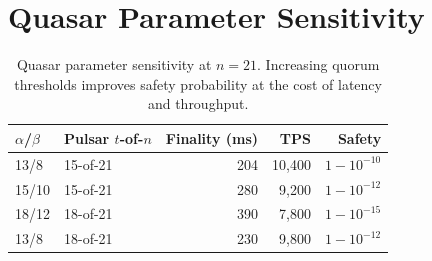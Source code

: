 \section{Quasar Parameter Sensitivity}

\label{app:params}

\begin{table}[h]
\centering
\begin{tabular}{@{}llrrr@{}}
\toprule
\textbf{$\alpha$/$\beta$} & \textbf{Pulsar $t$-of-$n$} & \textbf{Finality (ms)} & \textbf{TPS} & \textbf{Safety} \\
\midrule
13/8   & 15-of-21 & 204   & 10{,}400 & $1 - 10^{-10}$ \\
15/10  & 15-of-21 & 280   & 9{,}200  & $1 - 10^{-12}$ \\
18/12  & 18-of-21 & 390   & 7{,}800  & $1 - 10^{-15}$ \\
13/8   & 18-of-21 & 230   & 9{,}800  & $1 - 10^{-12}$ \\
\bottomrule
\end{tabular}
\caption{Quasar parameter sensitivity at $n=21$. Increasing quorum thresholds
improves safety probability at the cost of latency and throughput.}
\label{tab:params}
\end{table}

